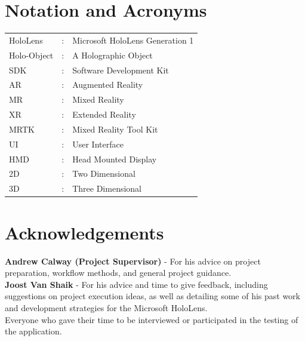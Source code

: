 \documentclass[ %
                author={Finn Alexander Wilkinson},
                supervisor={Dr. Andrew Calway},
                degree={MEng},
                title={\centering A Mixed Reality Aim Assistant for Pool and Snooker},
                subtitle={},
                type={Enterprise},
                year={2021} ]{dissertation}
\begin{document}
\chapter*{Notation and Acronyms}
\begin{tabular}{lcl}
HoloLens            &:      & Microsoft HoloLens Generation 1       \\
Holo-Object         &:      & A Holographic Object                  \\
SDK                 &:      & Software Development Kit              \\
AR                  &:      & Augmented Reality                     \\
MR                  &:      & Mixed Reality                         \\
XR                  &:      & Extended Reality                      \\
MRTK                &:      & Mixed Reality Tool Kit                \\
UI                  &:      & User Interface                        \\
HMD                 &:      & Head Mounted Display                  \\
2D                  &:      & Two Dimensional                       \\
3D                  &:      & Three Dimensional                     \\
\end{tabular}


\chapter*{Acknowledgements}

\textbf{Andrew Calway (Project Supervisor)} - For his advice on project preparation, workflow methods, and general project guidance. \\
\newline
\textbf{Joost Van Shaik} - For his advice and time to give feedback, including suggestions on project execution ideas, as well as detailing some of his past work and development strategies for the Microsoft HoloLens. \\
\newline
Everyone who gave their time to be interviewed or participated in the testing of the application.\\
\end{document}
